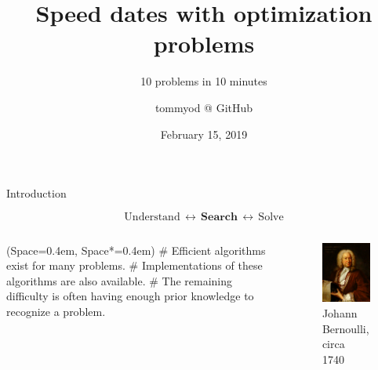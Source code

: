 \documentclass[11pt, aspectratio=149]{beamer}
\title{Speed dates with optimization problems}
\subtitle{10 problems in 10 minutes}
\institute{}
\author{{\footnotesize tommyod @ GitHub}}
\date{February 15, 2019}
\newcommand{\listSpace}{0.4em}
\theoremstyle{plain}
\begin{document}
\maketitle
	
\begin{frame}[fragile]{Introduction}
	
	\begin{equation*}
	\text{Understand}
	 \, \leftrightarrow \,
	 \textbf{Search} 
	 \, \leftrightarrow \,
	 \text{Solve}
	\end{equation*}
	
	\begin{columns}
		\begin{column}{0.55\textwidth}
	\begin{easylist}[itemize]
		\ListProperties(Space=\listSpace, Space*=\listSpace)
		# Efficient algorithms exist for many problems.
		# Implementations of these algorithms are also available.
		# The remaining difficulty is often having enough prior knowledge to recognize a problem. 
	\end{easylist}
		\end{column}
		\begin{column}{0.45\textwidth}%
			\begin{figure}
				\centering
				\includegraphics[width=0.75\linewidth]{figs/Johann_Bernoulli.jpg}
				\caption{{\scriptsize Johann Bernoulli, circa 1740}}
			\end{figure}
		\end{column}
	\end{columns}
\end{frame}
\end{document}
